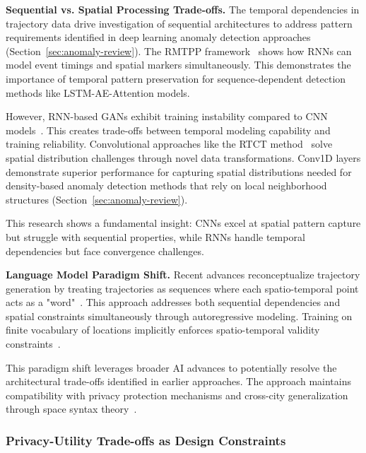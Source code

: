 \documentclass[runningheads]{llncs}
\begin{document}
\textbf{Sequential vs. Spatial Processing Trade-offs.} The temporal dependencies in trajectory data drive investigation of sequential architectures to address pattern requirements identified in deep learning anomaly detection approaches (Section~\ref{sec:anomaly-review}). The RMTPP framework~\cite{duRecurrentMarkedTemporal2016} shows how RNNs can model event timings and spatial markers simultaneously. This demonstrates the importance of temporal pattern preservation for sequence-dependent detection methods like LSTM-AE-Attention models.

However, RNN-based GANs exhibit training instability compared to CNN models~\cite{merhiSyntheticTrajectoryGeneration2024}. This creates trade-offs between temporal modeling capability and training reliability. Convolutional approaches like the RTCT method~\cite{merhiSyntheticTrajectoryGeneration2024} solve spatial distribution challenges through novel data transformations. Conv1D layers demonstrate superior performance for capturing spatial distributions needed for density-based anomaly detection methods that rely on local neighborhood structures (Section~\ref{sec:anomaly-review}).

This research shows a fundamental insight: CNNs excel at spatial pattern capture but struggle with sequential properties, while RNNs handle temporal dependencies but face convergence challenges.

\textbf{Language Model Paradigm Shift.} Recent advances reconceptualize trajectory generation by treating trajectories as sequences where each spatio-temporal point acts as a "word"~\cite{zhangEndtoendTrajectoryGeneration2025}. This approach addresses both sequential dependencies and spatial constraints simultaneously through autoregressive modeling. Training on finite vocabulary of locations implicitly enforces spatio-temporal validity constraints~\cite{kongMobilityTrajectoryGeneration2023}.

This paradigm shift leverages broader AI advances to potentially resolve the architectural trade-offs identified in earlier approaches. The approach maintains compatibility with privacy protection mechanisms and cross-city generalization through space syntax theory~\cite{wangGTGGeneralizableTrajectory2025}.

\subsubsection{Privacy-Utility Trade-offs as Design Constraints}
\end{document}

